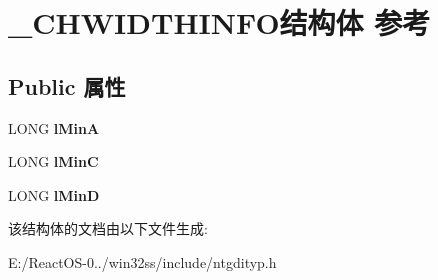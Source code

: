 \hypertarget{struct___c_h_w_i_d_t_h_i_n_f_o}{}\section{\+\_\+\+C\+H\+W\+I\+D\+T\+H\+I\+N\+F\+O结构体 参考}
\label{struct___c_h_w_i_d_t_h_i_n_f_o}
\subsection*{Public 属性}
\begin{DoxyCompactItemize}
\item 
\mbox{\label{struct___c_h_w_i_d_t_h_i_n_f_o_aeee4fbeeb0843ca1f96a172990a73149}} 
L\+O\+NG {\bfseries l\+MinA}
\item 
\mbox{\label{struct___c_h_w_i_d_t_h_i_n_f_o_acfc32b61de483210267dd990aa7791db}} 
L\+O\+NG {\bfseries l\+MinC}
\item 
\mbox{\label{struct___c_h_w_i_d_t_h_i_n_f_o_ace9f9adaaff7c777d6a3c9ac045a8c8a}} 
L\+O\+NG {\bfseries l\+MinD}
\end{DoxyCompactItemize}


该结构体的文档由以下文件生成\+:\begin{DoxyCompactItemize}
\item 
E\+:/\+React\+O\+S-\/0../win32ss/include/ntgdityp.\+h\end{DoxyCompactItemize}
